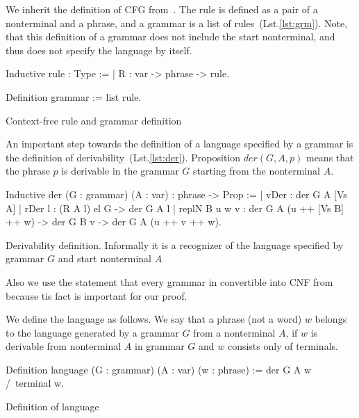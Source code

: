 We inherit the definition of CFG from~\cite{smolkaHofmann2016}. The rule is defined as a pair of a nonterminal and a phrase, and a grammar is a list of rules~(Lst.\ref{lst:grm}).
Note, that this definition of a grammar does not include the start nonterminal, and thus does not specify the language by itself.

\begin{listing}[h]
    \begin{pyglist}[language=coq, numbers=none, numbersep=5pt]
  Inductive rule : Type :=
  | R : var -> phrase -> rule.
        
  Definition grammar := list rule.
    \end{pyglist}
    \caption{Context-free rule and grammar definition}
    \label{lst:grm}
\end{listing}

An important step towards the definition of a language specified by a grammar is the definition of derivability~(Lst.\ref{lst:der}). Proposition $der(G, A, p)$ means that the phrase $p$ is derivable in the grammar $G$ starting from the nonterminal $A$.

\begin{listing}[h]
    \begin{pyglist}[language=coq, numbers=none, numbersep=5pt]
  Inductive der (G : grammar) 
                (A : var) : phrase -> Prop :=
  | vDer : der G A [Vs A]
  | rDer l : (R A l) el G -> der G A l
  | replN B u w v : 
      der G A (u ++ [Vs B] ++ w) -> 
      der G B v -> der G A (u ++ v ++ w).
    \end{pyglist}
    \caption{Derivability definition. Informally it is a recognizer of the language specified by grammar $G$ and start nonterminal $A$}
    \label{lst:der}
\end{listing}

Also we use the statement that every grammar in convertible into CNF from~\cite{smolkaHofmann2016} because tis fact is important for our proof.

We define the language as follows. We say that a phrase (not a word) $ w $ belongs to the language generated by a grammar $G$ from a nonterminal $A$, if $ w $ is derivable from nonterminal $ A $ in grammar $ G $ and $ w $ consists only of terminals.

\begin{listing}[h]
	\begin{pyglist}[language=coq, numbers=none, numbersep=5pt]
  Definition language 
             (G : grammar)
             (A : var)
             (w : phrase) :=
    der G A w /\ terminal w.
	\end{pyglist}
	\caption{Definition of language}
	\label{lst:lang}
\end{listing}



